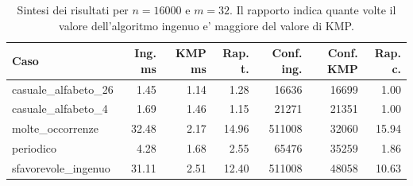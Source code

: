 \begin{table}[H]
\centering
\small
\begin{tabular}{lrrrrrr}
\toprule
Caso & Ing. ms & KMP ms & Rap. t. & Conf. ing. & Conf. KMP & Rap. c.\\
\midrule
casuale\_alfabeto\_26 & 1.45 & 1.14 & 1.28 & 16636 & 16699 & 1.00\\
casuale\_alfabeto\_4 & 1.69 & 1.46 & 1.15 & 21271 & 21351 & 1.00\\
molte\_occorrenze & 32.48 & 2.17 & 14.96 & 511008 & 32060 & 15.94\\
periodico & 4.28 & 1.68 & 2.55 & 65476 & 35259 & 1.86\\
sfavorevole\_ingenuo & 31.11 & 2.51 & 12.40 & 511008 & 48058 & 10.63\\
\bottomrule
\end{tabular}
\caption{Sintesi dei risultati per $n=16000$ e $m=32$. Il rapporto indica quante volte il valore dell'algoritmo ingenuo e' maggiore del valore di KMP.}
\label{tab:sintesi-16000-32}
\end{table}
